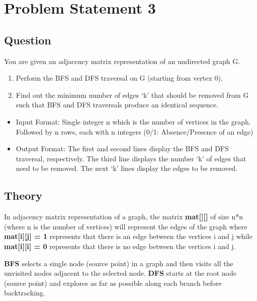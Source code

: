 \documentclass[11pt,a4paper]{article}
\begin{document}
\section{Problem Statement 3}\label{sec:problem3}
\subsection{Question}\label{sec:question3}
You are given an adjacency matrix representation of an undirected graph G.
\begin{enumerate}
    \item Perform the BFS and DFS traversal on G (starting from vertex 0).
    \item Find out the minimum number of edges ‘k’ that should be removed from G such that BFS and DFS traversals produce an identical sequence.
\end{enumerate}
\begin{itemize}
    \item Input Format: Single integer n which is the number of vertices in the graph. Followed by n rows,  each with n integers (0/1: Absence/Presence of an edge)
    \item Output Format: The first and second lines display the BFS and DFS traversal, respectively. The third line displays the number ‘k’ of edges that need to be removed. The next ‘k’ lines display the edges to be removed.
\end{itemize}

\subsection{Theory}\label{sec:theory3}
In adjacency matrix representation of a graph, the matrix \textbf{mat[][]} of size n*n (where n is the number of vertices) will represent the edges of the graph where \textbf{ mat[i][j] = 1 } represents that there is an edge between the vertices i and j while \textbf{mat[i][i] = 0} represents that there is no edge between the vertices i and j.

\textbf{BFS} selects a single node (source point) in a graph and then visits all the unvisited nodes adjacent to the selected node. \textbf{DFS} starts at the root node (source point) and explores as far as possible along each branch before backtracking.
\end{document}
